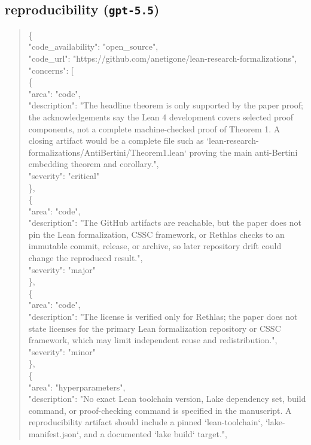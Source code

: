 \documentclass[11pt]{article}
\begin{document}
\subsection*{reproducibility (\texttt{gpt-5.5})}
\begin{quote}\small\ttfamily\raggedright
\{\\
  "code\_availability": "open\_source",\\
  "code\_url": "https://github.com/anetigone/lean-research-formalizations",\\
  "concerns": [\\
    \{\\
      "area": "code",\\
      "description": "The headline theorem is only supported by the paper proof; the acknowledgements say the Lean 4 development covers selected proof components, not a complete machine-checked proof of Theorem 1. A closing artifact would be a complete file such as `lean-research-formalizations/AntiBertini/Theorem1.lean` proving the main anti-Bertini embedding theorem and corollary.",\\
      "severity": "critical"\\
    \},\\
    \{\\
      "area": "code",\\
      "description": "The GitHub artifacts are reachable, but the paper does not pin the Lean formalization, CSSC framework, or Rethlas checks to an immutable commit, release, or archive, so later repository drift could change the reproduced result.",\\
      "severity": "major"\\
    \},\\
    \{\\
      "area": "code",\\
      "description": "The license is verified only for Rethlas; the paper does not state licenses for the primary Lean formalization repository or CSSC framework, which may limit independent reuse and redistribution.",\\
      "severity": "minor"\\
    \},\\
    \{\\
      "area": "hyperparameters",\\
      "description": "No exact Lean toolchain version, Lake dependency set, build command, or proof-checking command is specified in the manuscript. A reproducibility artifact should include a pinned `lean-toolchain`, `lake-manifest.json`, and a documented `lake build` target.",\\

\end{quote}
\end{document}
